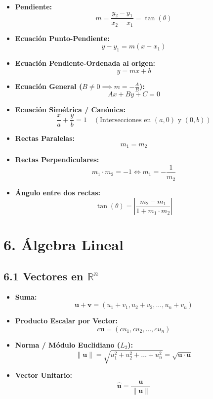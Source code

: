 \documentclass[11pt,a4paper]{article}
\begin{document}
\begin{itemize}
  \item \textbf{Pendiente:}
  \[
    m = \frac{y_2 - y_1}{x_2 - x_1} = \tan(\theta)
  \]
  \item \textbf{Ecuación Punto-Pendiente:}
  \[
    y - y_1 = m(x - x_1)
  \]
  \item \textbf{Ecuación Pendiente-Ordenada al origen:}
  \[
    y = mx + b
  \]
  \item \textbf{Ecuación General ($B \ne 0 \implies m = -\frac{A}{B}$):}
  \[
    Ax + By + C = 0
  \]
  \item \textbf{Ecuación Simétrica / Canónica:}
  \[
    \frac{x}{a} + \frac{y}{b} = 1 \quad (\text{Intersecciones en } (a,0) \text{ y } (0,b))
  \]
  \item \textbf{Rectas Paralelas:}
  \[
    m_1 = m_2
  \]
  \item \textbf{Rectas Perpendiculares:}
  \[
    m_1 \cdot m_2 = -1 \iff m_1 = -\frac{1}{m_2}
  \]
  \item \textbf{Ángulo entre dos rectas:}
  \[
    \tan(\theta) = \left|\frac{m_2 - m_1}{1 + m_1 \cdot m_2}\right|
  \]
\end{itemize}

\section*{6. Álgebra Lineal}

\subsection*{6.1 Vectores en $\mathbb{R}^n$}

\begin{itemize}
  \item \textbf{Suma:}
  \[
    \mathbf{u} + \mathbf{v} = (u_1 + v_1, u_2 + v_2, \dots, u_n + v_n)
  \]
  \item \textbf{Producto Escalar por Vector:}
  \[
    c\mathbf{u} = (cu_1, cu_2, \dots, cu_n)
  \]
  \item \textbf{Norma / Módulo Euclidiano ($L_2$):}
  \[
    \|\mathbf{u}\| = \sqrt{u_1^2 + u_2^2 + \dots + u_n^2} = \sqrt{\mathbf{u} \cdot \mathbf{u}}
  \]
  \item \textbf{Vector Unitario:}
  \[
    \hat{\mathbf{u}} = \frac{\mathbf{u}}{\|\mathbf{u}\|}
  \]
\end{itemize}
\end{document}
